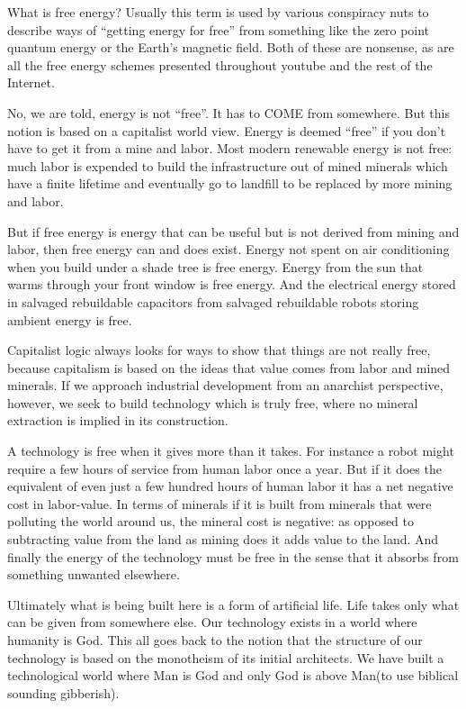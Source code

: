 What is free energy? Usually this term is used by various conspiracy
nuts to describe ways of ``getting energy for free'' from something like
the zero point quantum energy or the Earth's magnetic field. Both of
these are nonsense, as are all the free energy schemes presented
throughout youtube and the rest of the Internet.

No, we are told, energy is not ``free''. It has to COME from somewhere.
But this notion is based on a capitalist world view. Energy is deemed
``free'' if you don't have to get it from a mine and labor. Most modern
renewable energy is not free: much labor is expended to build the
infrastructure out of mined minerals which have a finite lifetime and
eventually go to landfill to be replaced by more mining and labor.

But if free energy is energy that can be useful but is not derived from
mining and labor, then free energy can and does exist. Energy not spent
on air conditioning when you build under a shade tree is free energy.
Energy from the sun that warms through your front window is free energy.
And the electrical energy stored in salvaged rebuildable capacitors from
salvaged rebuildable robots storing ambient energy is free.

Capitalist logic always looks for ways to show that things are not
really free, because capitalism is based on the ideas that value comes
from labor and mined minerals. If we approach industrial development
from an anarchist perspective, however, we seek to build technology
which is truly free, where no mineral extraction is implied in its
construction.

A technology is free when it gives more than it takes. For instance a
robot might require a few hours of service from human labor once a year.
But if it does the equivalent of even just a few hundred hours of human
labor it has a net negative cost in labor-value. In terms of minerals if
it is built from minerals that were polluting the world around us, the
mineral cost is negative: as opposed to subtracting value from the land
as mining does it adds value to the land. And finally the energy of the
technology must be free in the sense that it absorbs from something
unwanted elsewhere.

Ultimately what is being built here is a form of artificial life. Life
takes only what can be given from somewhere else. Our technology exists
in a world where humanity is God. This all goes back to the notion that
the structure of our technology is based on the monotheism of its
initial architects. We have built a technological world where Man is God
and only God is above Man(to use biblical sounding gibberish).

